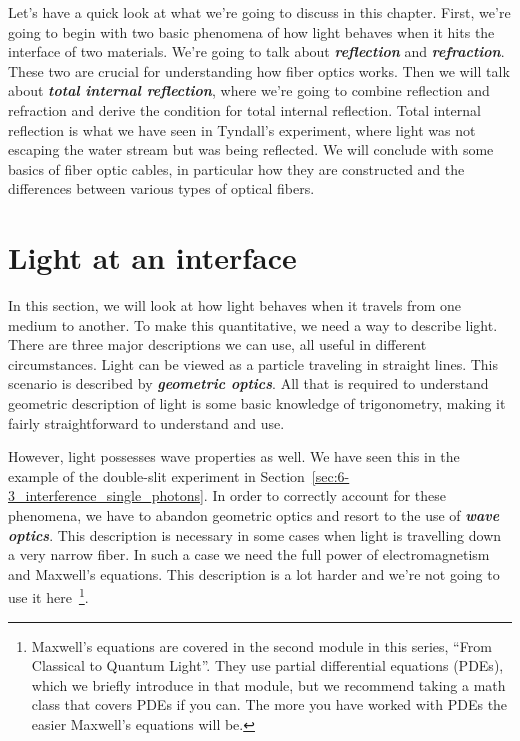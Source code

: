 Let's have a quick look at what we're going to discuss in this chapter.
First, we're going to begin with two basic phenomena of how light behaves when it hits the interface of two materials.
We're going to talk about \textbf{\emph{reflection}} and \textbf{\emph{refraction}}.
These two are crucial for understanding how fiber optics works.
Then we will talk about \textbf{\emph{total internal reflection}}, where we're going to combine reflection and refraction and derive the condition for total internal reflection.
Total internal reflection is what we have seen in Tyndall's experiment, where light was not escaping the water stream but was being reflected.
We will conclude with some basics of fiber optic cables, in particular how they are constructed and the differences between various types of optical fibers.


\section{Light at an interface}
\label{sec:7-2_light_at_interface}

In this section, we will look at how light behaves when it travels from one medium to another.
To make this quantitative, we need a way to describe light. 
There are three major descriptions we can use, all useful in different circumstances.
Light can be viewed as a particle traveling in straight lines.
This scenario is described by \textbf{\emph{geometric optics}}.
All that is required to understand geometric description of light is some basic knowledge of trigonometry, making it fairly straightforward to understand and use.

However, light possesses wave properties as well.
We have seen this in the example of the double-slit experiment in Section~\ref{sec:6-3_interference_single_photons}. 
In order to correctly account for these phenomena, we have to abandon geometric optics and resort to the use of \textit{\textbf{wave optics}}.
This description is necessary in some cases when light is travelling down a very narrow fiber.
In such a case we need the full power of electromagnetism and Maxwell's equations.
This description is a lot harder and we're not going to use it here~\footnote{Maxwell's equations are covered in the second module in this series, ``From Classical to Quantum Light''.  They use partial differential equations (PDEs), which we briefly introduce in that module, but we recommend taking a math class that covers PDEs if you can. The more you have worked with PDEs the easier Maxwell's equations will be.}.

